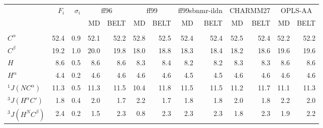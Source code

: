 \documentclass[12pt]{article}
\begin{document}
\begin{table}

\small

\begin{tabular}{lrrrrrrrrrrrr}
\toprule
   &  $F_i$ &  $\sigma_i$ &  \multicolumn{2}{c}{ff96}             &  \multicolumn{2}{c}{ff99}    &  \multicolumn{2}{c}{ff99sbnmr-ildn}   &  \multicolumn{2}{c}{CHARMM27}       &  \multicolumn{2}{c}{OPLS-AA}               \\
   &        &             &  MD   & BELT & MD   & BELT & MD   & BELT & MD   & BELT & MD   & BELT  \\
         &      &              &          &                 &          &                 &                    &                           &           &                  &         &                \\
$C^\alpha$           & 52.4 &          0.9 &     52.1 &            52.2 &     52.8 &            52.5 &               52.4 &                      52.4 &      52.5 &             52.4 &    52.2 &           52.2 \\
$C^\beta$           & 19.2 &          1.0 &     20.0 &            19.8 &     18.0 &            18.8 &               18.3 &                      18.4 &      18.2 &             18.6 &    19.6 &           19.6 \\
$H$            &  8.6 &          0.5 &      8.6 &             8.6 &      8.3 &             8.4 &                8.2 &                       8.2 &       8.3 &              8.3 &     8.6 &            8.6 \\
$H^\alpha$           &  4.4 &          0.2 &      4.6 &             4.6 &      4.6 &             4.6 &                4.5 &                       4.5 &       4.6 &              4.6 &     4.6 &            4.6 \\
$^1J(NC^\alpha)$      & 11.3 &          0.5 &     11.3 &            11.5 &     10.4 &            11.8 &               11.5 &                      11.5 &      11.2 &             11.7 &    11.1 &           11.3 \\
$^3J(H^\alpha C\prime)$ &  1.8 &          0.4 &      2.0 &             1.7 &      2.2 &             1.7 &                1.8 &                       1.8 &       2.0 &              1.8 &     2.2 &            2.0 \\
$^3J(H^NC^\beta)$     &  2.4 &          0.2 &      1.5 &             2.3 &      0.8 &             2.3 &                2.3 &                       2.3 &       1.8 &              2.3 &     1.9 &            2.2 \\

\end{tabular}
\end{table}
\end{document}
